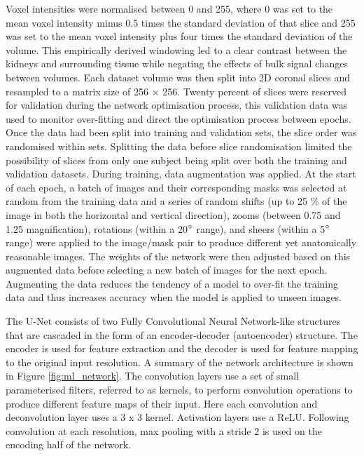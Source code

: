 Voxel intensities were normalised between 0 and 255, where 0 was set to the mean voxel intensity minus 0.5 times the standard deviation of that slice and 255 was set to the mean voxel intensity plus four times the standard deviation of the volume. This empirically derived windowing led to a clear contrast between the kidneys and surrounding tissue while negating the effects of bulk signal changes between volumes. Each dataset volume was then split into 2D coronal slices and resampled to a matrix size of 256 $\times$ 256. Twenty percent of slices were reserved for validation during the network optimisation process, this validation data was used to monitor over-fitting and direct the optimisation process between epochs. Once the data had been split into training and validation sets, the slice order was randomised within sets. Splitting the data before slice randomisation limited the possibility of slices from only one  subject being split over both the training and validation datasets. During training, data augmentation was applied. At the start of each epoch, a batch of images and their corresponding masks was selected at random from the training data and a series of random shifts (up to 25 \% of the image in both the horizontal and vertical direction), zooms (between 0.75 and 1.25 magnification), rotations (within a 20$\degree$ range), and sheers (within a 5$\degree$ range) were applied to the image/mask pair to produce different yet anatomically reasonable images. The weights of the network were then adjusted based on this augmented data before selecting a new batch of images for the next epoch. Augmenting the data reduces the tendency of a model to over-fit the training data and thus increases accuracy when the model is applied to unseen images. 

The U-Net consists of two Fully Convolutional Neural Network-like structures that are cascaded in the form of an encoder-decoder (autoencoder) structure. The encoder is used for feature extraction and the decoder is used for feature mapping to the original input resolution. A summary of the network architecture is shown in Figure \ref{fig:ml_network}. The convolution layers use a set of small parameterised filters, referred to as kernels, to perform convolution operations to produce different feature maps of their input. Here each convolution and deconvolution layer uses a 3 x 3 kernel. Activation layers use a \ac{ReLU}. Following convolution at each resolution, max pooling with a stride 2 is used on the encoding half of the network.

